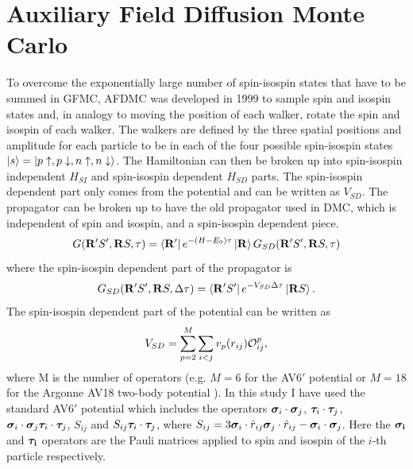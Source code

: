 \section{Auxiliary Field Diffusion Monte Carlo}
\label{sec:AFDMC}
To overcome the exponentially large number of spin-isospin states that have to be summed in GFMC, AFDMC was developed in 1999 \cite{schmidt1999} to sample spin and isospin states and, in analogy to moving the position of each walker, rotate the spin and isospin of each walker. The walkers are defined by the three spatial positions and amplitude for each particle to be in each of the four possible spin-isospin states $\left| s \right> = \left| p\uparrow,p\downarrow,n\uparrow,n\downarrow \right>$. The Hamiltonian can then be broken up into spin-isospin independent $H_{SI}$ and spin-isospin dependent $H_{SD}$ parts. The spin-isospin dependent part only comes from the potential and can be written as $V_{SD}$. The propagator can be broken up to have the old propagator used in DMC, which is independent of spin and isospin, and a spin-isospin dependent piece.
\begin{equation}
   G(\mathbf{R}'S',\mathbf{R} S,\tau)=\left< \mathbf{R}' \right|e^{-(H-E_0)\tau}\left| \mathbf{R} \right>G_{SD}(\mathbf{R}'S',\mathbf{R} S,\tau)
\end{equation}
where the spin-isospin dependent part of the propagator is
\begin{equation}
   G_{SD}(\mathbf{R}'S',\mathbf{R} S,\Delta\tau) = \left< \mathbf{R}'S' \right|e^{-V_{SD}\Delta\tau} \left| \mathbf{R} S \right>.
\end{equation}
The spin-isospin dependent part of the potential can be written as
\begin{equation}
   V_{SD} = \sum\limits_{p=2}^{M}\sum\limits_{i<j} v_p(r_{ij})\mathcal{O}_{ij}^p,
\end{equation}
where M is the number of operators (e.g. $M=6$ for the AV6$'$ potential or $M=18$ for the Argonne AV18 two-body potential \cite{wiringa1984}). In this study I have used the standard AV6$'$ potential which includes the operators $\bm{\sigma}_i\cdot\bm{\sigma}_j$, $\bm{\tau}_i\cdot\bm{\tau}_j$, $\bm{\sigma}_i\cdot\bm{\sigma}_j \bm{\tau}_i\cdot\bm{\tau}_j$, $S_{ij}$ and $S_{ij} \bm{\tau}_i\cdot\bm{\tau}_j$, where $S_{ij} = 3\bm{\sigma}_i\cdot\hat{r}_{ij}\bm{\sigma}_j\cdot\hat{r}_{ij}-\bm{\sigma}_i\cdot\bm{\sigma}_j$. Here the $\mathbf{\bm{\sigma}_i}$ and $\mathbf{\bm{\tau}_i}$ operators are the Pauli matrices applied to spin and isospin of the $i$-th particle respectively.

